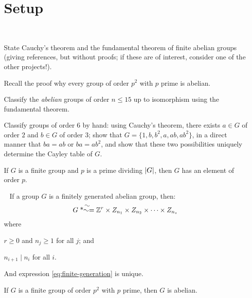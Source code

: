 \section{Setup}~\label{sec:setup}

\begin{Answer}
  \begin{enumalph}
    \item State Cauchy's theorem and the fundamental theorem of finite abelian groups 
      (giving references, but without proofs; if these are of interest, consider one of 
      the other projects!).  
    \item Recall the proof why every group of order $p^2$ with $p$ prime is abelian.  
    \item Classify the \emph{abelian} groups of order $n \leq 15$ up to isomorphism 
    using the fundamental theorem.
    \item Classify groups of order $6$ by hand: using Cauchy's theorem, there exists $a
    \in G$ of order $2$ and $b \in G$ of order $3$;
      show that $G=\{1,b,b^2,a,ab,ab^2\}$, in a direct manner that
      $ba=ab$ or $ba=ab^2$, and show that these two possibilities uniquely determine
      the Cayley table of $G$.
  \end{enumalph}
\end{Answer}

\begin{theorem}\label{thm:cauchy}
  If $G$ is a finite group and $p$ is a prime dividing $\lvert G\rvert$,
  then $G$ has an element of order $p$.~\cite[p.~93,~Theorem~3.1]{DummitFoote} 
\end{theorem}

\begin{theorem}~\label{thm:ftfgag}
  If a group $G$ is a finitely generated abelian group, then:
  \begin{align}
    G \isom \Z^r \times Z_{n_1} \times Z_{n_2} \times \cdots \times Z_{n_s}
    ~\label{eq:finite-generation}
  \end{align}
  where
  \begin{enumalph}
    \item $r \ge 0$ and $n_j \ge 1$ for all $j$; and
    \item $n_{i+1} \mid n_i$ for all $i$.
  \end{enumalph}
  And expression \ref{eq:finite-generation} is unique.
\end{theorem}

\begin{theorem}
  If $G$ is a finite group of order $p^2$ with $p$ prime, then $G$ is abelian.~\label{thm:p2-abelian}
\end{theorem}

